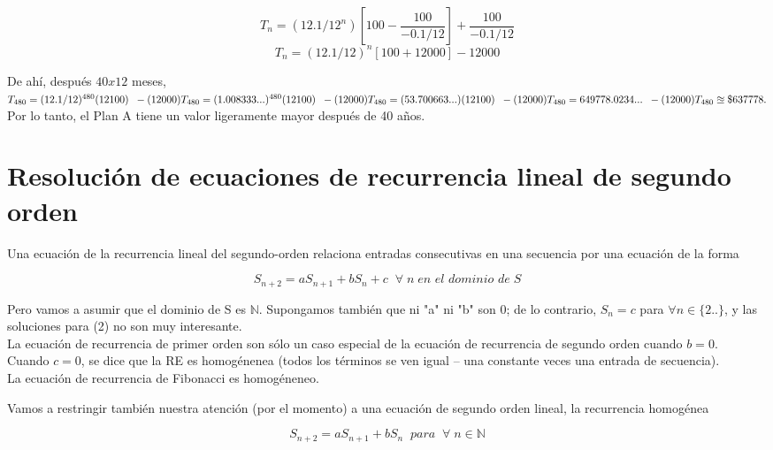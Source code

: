 \documentclass{article}
\begin{document}
$$T_n = (12.1/12^{n})\left[100 - \frac{100}{-0.1/12}\right] + \frac{100}{-0.1/12}$$
$$T_n = (12.1/12)^{n}[100 + 12000] - 12000$$

De ahí, después $40x12$ meses,\\

$
T_{480}=(12.1/12)^{480}(12100) \;\; -(12000)\\
T_{480}=(1.008333...)^{480}(12100)\;\; -(12000)\\
T_{480}=(53.700663...)(12100)\;\; -(12000)\\
T_{480}=649778.0234... \;\; -(12000)\\
T_{480}\approxeq \$637778.
$\\
Por lo tanto, el Plan A tiene un valor ligeramente mayor después de 40 años.

\section{Resolución de ecuaciones de recurrencia lineal de segundo orden}

Una ecuación de la recurrencia lineal del segundo-orden relaciona entradas consecutivas en una secuencia por una ecuación de la forma

\begin{equation}
  S_{n+2} = aS_{n+1} + bS_{n} + c \;\; \forall\; n \; \textit{en el dominio de} \; S
\end{equation}

Pero vamos a asumir que el dominio de S es $\mathbb{N}$. Supongamos también que ni "a" ni "b" son 0; de lo contrario, $S_n = c$ para $\forall n \in  \{2.. \}$, y las soluciones para (2) no son muy interesante.\\

La ecuación de recurrencia de primer orden son sólo un caso especial de la ecuación de recurrencia de  segundo orden  cuando $b = 0$.\\

Cuando $c = 0$, se dice que la RE es homogénenea (todos los términos se ven igual – una constante veces una entrada de secuencia).\\

La ecuación de recurrencia de Fibonacci es homogéneneo.

Vamos a restringir también nuestra atención (por el momento) a una ecuación de segundo orden lineal, la recurrencia homogénea

\begin{equation}
S_{n+2} = aS_{n+1} + bS_{n}\;\; \textit{para} \;\; \forall\; n \in \mathbb{N}
\end{equation}
\end{document}
